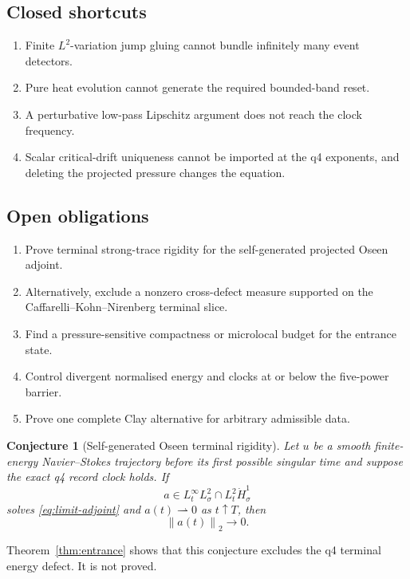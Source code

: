 \documentclass[11pt]{article}
\newtheorem{conjecture}[theorem]{Conjecture}
\theoremstyle{remark}
\newcommand{\norm}[1]{\left\|#1\right\|}
\newcommand{\weakto}{\rightharpoonup}
\begin{document}
\subsection*{Closed shortcuts}

\begin{enumerate}
\item Finite \(L^2\)-variation jump gluing cannot bundle infinitely many
event detectors.
\item Pure heat evolution cannot generate the required bounded-band
reset.
\item A perturbative low-pass Lipschitz argument does not reach the
clock frequency.
\item Scalar critical-drift uniqueness cannot be imported at the q4
exponents, and deleting the projected pressure changes the equation.
\end{enumerate}

\subsection*{Open obligations}

\begin{enumerate}
\item Prove terminal strong-trace rigidity for the self-generated
projected Oseen adjoint.
\item Alternatively, exclude a nonzero cross-defect measure supported
on the Caffarelli--Kohn--Nirenberg terminal slice.
\item Find a pressure-sensitive compactness or microlocal budget for the
entrance state.
\item Control divergent normalised energy and clocks at or below the
five-power barrier.
\item Prove one complete Clay alternative for arbitrary admissible data.
\end{enumerate}

\begin{conjecture}[Self-generated Oseen terminal rigidity]
Let \(u\) be a smooth finite-energy Navier--Stokes trajectory before its
first possible singular time and suppose the exact q4 record clock holds.
If
\[
 a\in L^\infty_tL^2_\sigma\cap L^2_t\dot H^1_\sigma
\]
solves \eqref{eq:limit-adjoint} and
\(a(t)\weakto0\) as \(t\uparrow T\), then
\[
 \norm{a(t)}_2\longrightarrow0.
\]
\end{conjecture}

Theorem~\ref{thm:entrance} shows that this conjecture excludes the q4
terminal energy defect.  It is not proved.
\end{document}
